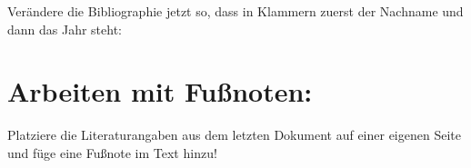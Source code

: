\begin{minipage}[h]{\textwidth}
Verändere die Bibliographie jetzt so, dass in Klammern zuerst der Nachname und dann das Jahr steht:

\end{minipage}

\section{Arbeiten mit Fußnoten:}
Platziere die Literaturangaben aus dem letzten Dokument auf einer eigenen Seite und füge eine Fußnote im Text hinzu!

\newpage
